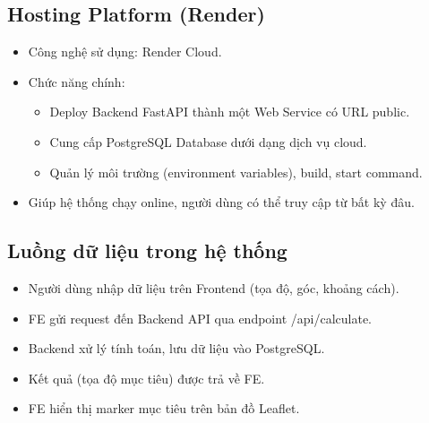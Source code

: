 \subsection{Hosting Platform (Render)}
\begin{itemize}
    \item Công nghệ sử dụng: Render Cloud.
    \item Chức năng chính:
    \begin{itemize}
        \item Deploy Backend FastAPI thành một Web Service có URL public.
        \item Cung cấp PostgreSQL Database dưới dạng dịch vụ cloud.
        \item Quản lý môi trường (environment variables), build, start command.
    \end{itemize}
    \item Giúp hệ thống chạy online, người dùng có thể truy cập từ bất kỳ đâu.
\end{itemize}

\subsection{Luồng dữ liệu trong hệ thống}
\begin{itemize}
    \item Người dùng nhập dữ liệu trên Frontend (tọa độ, góc, khoảng cách).
    \item FE gửi request đến Backend API qua endpoint /api/calculate.
    \item Backend xử lý tính toán, lưu dữ liệu vào PostgreSQL.
    \item Kết quả (tọa độ mục tiêu) được trả về FE.
    \item FE hiển thị marker mục tiêu trên bản đồ Leaflet.
\end{itemize}